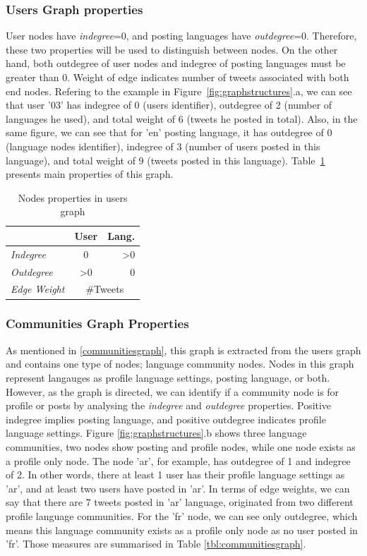 \documentclass{llncs}
\begin{document}
\subsubsection{Users Graph properties}
User nodes have \emph{indegree}=0, and posting languages have 
\emph{outdegree}=0. Therefore, these two properties will be used to distinguish 
between nodes. On the other hand, both outdegree of user nodes and indegree of 
posting languages must be greater than 0. 
Weight of edge indicates number of tweets associated with both end nodes. 
Refering to the example in Figure~\ref{fig:graphstructures}.a, we can see that 
user '03' has indegree of 0 (users identifier), outdegree of 2 (number of languages 
he used), and total weight of 6 (tweets he posted in total). Also, in the same figure,
we can see that for 'en' posting language, it has outdegree of 0 (language nodes 
identifier), indegree of 3 (number of users posted in this language), and total weight 
of 9 (tweets posted in this language). Table~\ref{tbl:usersgraph} presents main 
properties of this graph.
\begin{table}[!htb]
\centering
\begin{tabular}{@{}lcr@{}}
\toprule
\textbf{}& \textbf{User} & \textbf{Lang.} \\ \midrule
{\emph{Indegree}} & 0 & \textgreater0 \\
{\emph{Outdegree}} & \textgreater0 & 0 \\ 
{\emph{Edge Weight}}& \multicolumn{2}{c}{\#Tweets}\\ \bottomrule
\end{tabular}
\caption{Nodes properties in users graph}
\label{tbl:usersgraph}
\end{table}

\subsubsection{Communities Graph Properties}
As mentioned in \ref{communitiesgraph}, this graph is extracted from the users
graph and contains one type of nodes; language community nodes. Nodes in 
this graph represent langauges as profile language settings, posting language, or both. 
However, as the graph is directed, we can identify if a community node is for profile or 
posts by analysing the \emph{indegree} and \emph{outdegree} properties. 
Positive indegree implies posting language, and positive outdegree indicates profile 
language settings. Figure \ref{fig:graphstructures}.b shows three language 
communities, two nodes show posting and profile nodes, while one node exists 
as a profile only node. The node 'ar', for example, has outdegree of 1 and indegree of 2. 
In other words, there at least 1 user has their profile language settings as 'ar', and at 
least two users have posted in 'ar'. In terms of edge weights, we can say that there are
7 tweets posted in 'ar' language, originated from two different profile language communities.
For the 'fr' node, we can see only outdegree, which means this language 
community exists as a profile only node as no user posted in 'fr'.
Those measures are summarised in Table \ref{tbl:communitiesgraph}.
\end{document}
